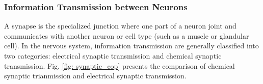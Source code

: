 \documentclass[journal,comsoc]{IEEEtran}
\begin{document}
	\subsubsection{Information Transmission between Neurons}
	A synapse is the specialized junction where one part of a neuron joint and communicates with another neuron or cell type (such as a muscle or glandular cell). 
	In the nervous system, information transmission are generally classified into two categories: electrical synaptic transmission and chemical synaptic transmission.
	Fig. \ref{fig: synaptic_cop} presents the comparison of chemical synaptic trianmission and electrical synaptic transmission.
	\begin{figure}[htbp]
		\centering
\end{figure}
\end{document}
